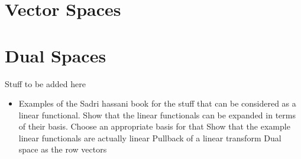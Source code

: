 \section{Vector Spaces}

\section{Dual Spaces}



Stuff to be added here

\begin{itemize}
	\item Examples of the Sadri hassani book for the stuff that can be considered as a linear functional. 
	\subitem Show that the linear functionals can be expanded in terms of their basis. Choose an appropriate basis for that
	\subitem Show that the example linear functionals are actually linear 
	\subitem Pullback of a linear transform
	\subitem Dual space as the row vectors
\end{itemize}